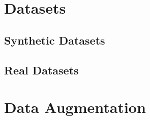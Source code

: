 \label{chapter:data-preparation}


\section{Datasets}


\subsection{Synthetic Datasets}


\subsection{Real Datasets}


\section{Data Augmentation}